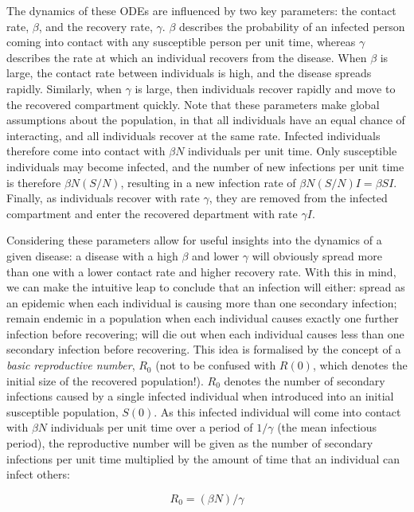 The dynamics of these ODEs are influenced by two key parameters: the contact rate, $\beta$, and the recovery rate, $\gamma$. $\beta$ describes the probability of an infected person coming into contact with any susceptible person per unit time, whereas $\gamma$ describes the rate at which an individual recovers from the disease. When $\beta$ is large, the contact rate between individuals is high, and the disease spreads rapidly. Similarly, when $\gamma$ is large, then individuals recover rapidly and move to the recovered compartment quickly. Note that these parameters make global assumptions about the population, in that all individuals have an equal chance of interacting, and all individuals recover at the same rate. Infected individuals therefore come into contact with $\beta$$N$ individuals per unit time. Only susceptible individuals may become infected, and the number of new infections per unit time is therefore $\beta$$N(S/N)$, resulting in a new infection rate of $\beta$$N(S/N)I = $$\beta$$SI$. Finally, as individuals recover with rate $\gamma$, they are removed from the infected compartment and enter the recovered department with rate $\gamma I$.

Considering these parameters allow for useful insights into the dynamics of a given disease: a disease with a high $\beta$ and lower $\gamma$ will obviously spread more than one with a lower contact rate and higher recovery rate. With this in mind, we can make the intuitive leap to conclude that an infection will either: spread as an epidemic when each individual is causing more than one secondary infection; remain endemic in a population when each individual causes exactly one further infection before recovering; will die out when each individual causes less than one secondary infection before recovering. This idea is formalised by the concept of a \emph{basic reproductive number}, $R_0$ (not to be confused with $R(0)$, which denotes the initial size of the recovered population!). $R_0$ denotes the number of secondary infections caused by a single infected individual when introduced into an initial susceptible population, $S(0)$. As this infected individual will come into contact with $\beta N$ individuals per unit time over a period of $1/$$\gamma$ (the mean infectious period), the reproductive number will be given as the number of secondary infections per unit time multiplied by the amount of time that an individual can infect others:\cite{anderson, diekmann}

\begin{equation*}
R_0 = (\beta N)/\gamma
\end{equation*}

